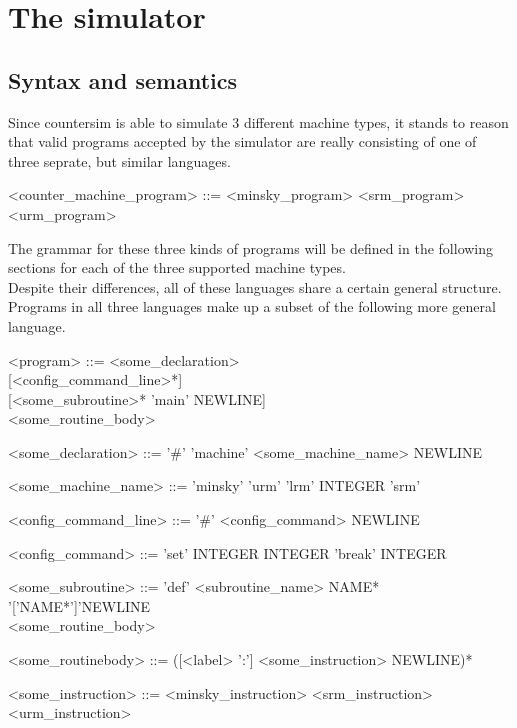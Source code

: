 \chapter{The simulator}
\label{chap:simulator}
\section{Syntax and semantics}
Since countersim is able to simulate 3 different machine types, it stands to reason that valid programs accepted by the simulator are really consisting of one of three seprate, but similar languages.
\setlength{\grammarindent}{5.5cm}
\begin{definition}
\hfill
\begin{grammar}
<counter\_machine\_program> ::= <minsky\_program>
                           \alt <srm\_program>
                           \alt <urm\_program>
\end{grammar}
\end{definition}

The grammar for these three kinds of programs will be defined in the following sections for each of the three supported machine types.\\
Despite their differences, all of these languages share a certain general structure. Programs in all three languages make up a subset of the following more general language.

\setlength{\grammarindent}{5cm}
\begin{definition}
\hfill
\begin{grammar}
<program> ::= <some\_declaration>\\{}[<config\_command\_line>*]\\{}[<some\_subroutine>* 'main' NEWLINE]\\<some\_routine\_body>

<some\_declaration> ::= '\#' 'machine' <some\_machine\_name> NEWLINE

<some\_machine\_name> ::= 'minsky'
                     \alt 'urm'
                     \alt 'lrm' INTEGER
                     \alt 'srm'

<config\_command\_line> ::= '\#' <config\_command> NEWLINE

<config\_command> ::= 'set' INTEGER INTEGER
                 \alt 'break' INTEGER

<some\_subroutine> ::= 'def' <subroutine\_name> NAME* '['NAME*']'NEWLINE\\<some\_routine\_body> 

<some\_routinebody> ::= ([<label> ':'] <some\_instruction> NEWLINE)*

<some\_instruction> ::= <minsky\_instruction>
                   \alt <srm\_instruction>
                   \alt <urm\_instruction>
\end{grammar}
\end{definition}


